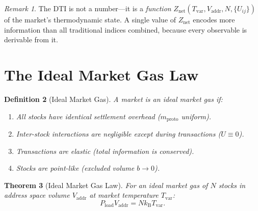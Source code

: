 \documentclass[twocolumn,10pt]{article}
\newtheorem{theorem}{Theorem}[section]
\newtheorem{definition}[theorem]{Definition}
\theoremstyle{remark}
\newtheorem{remark}[theorem]{Remark}
\newcommand{\kB}{k_{\mathrm{B}}}
\newcommand{\Tvar}{T_{\mathrm{var}}}
\newcommand{\Pload}{P_{\mathrm{load}}}
\newcommand{\Vaddr}{V_{\mathrm{addr}}}
\newcommand{\mproto}{m_{\mathrm{proto}}}
\newcommand{\Znet}{Z_{\mathrm{net}}}
\begin{document}
\begin{remark}
The DTI is not a number---it is a \emph{function} $\Znet(\Tvar, \Vaddr, N, \{U_{ij}\})$ of the market's thermodynamic state.  A single value of $\Znet$ encodes more information than all traditional indices combined, because every observable is derivable from it.
\end{remark}


\section{The Ideal Market Gas Law}
\label{sec:ideal_gas}

\begin{definition}[Ideal Market Gas]
\label{def:ideal_market}
A market is an \emph{ideal market gas} if:
\begin{enumerate}[label=(\roman*)]
    \item All stocks have identical settlement overhead ($\mproto$ uniform).
    \item Inter-stock interactions are negligible except during transactions ($U \equiv 0$).
    \item Transactions are elastic (total information is conserved).
    \item Stocks are point-like (excluded volume $b \to 0$).
\end{enumerate}
\end{definition}

\begin{theorem}[Ideal Market Gas Law]
\label{thm:ideal_gas}
For an ideal market gas of $N$ stocks in address space volume $\Vaddr$ at market temperature $\Tvar$:
\begin{equation}
    \boxed{\Pload \Vaddr = N \kB \Tvar}.
    \label{eq:ideal_gas_law}
\end{equation}
\end{theorem}
\end{document}
